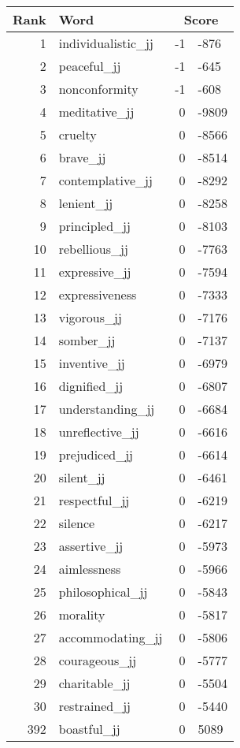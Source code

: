 \begin{longtable}[!htbp]{| rlr@{.}l |}
    \hline
    \textbf{Rank} & \textbf{Word} & \multicolumn{2}{c|}{\textbf{Score}} \\
    \hline
    \endhead
    1 & individualistic\_jj & -1 & -876 \\
    2 & peaceful\_jj & -1 & -645 \\
    3 & nonconformity & -1 & -608 \\
    4 & meditative\_jj & 0 & -9809 \\
    5 & cruelty & 0 & -8566 \\
    6 & brave\_jj & 0 & -8514 \\
    7 & contemplative\_jj & 0 & -8292 \\
    8 & lenient\_jj & 0 & -8258 \\
    9 & principled\_jj & 0 & -8103 \\
    10 & rebellious\_jj & 0 & -7763 \\
    11 & expressive\_jj & 0 & -7594 \\
    12 & expressiveness & 0 & -7333 \\
    13 & vigorous\_jj & 0 & -7176 \\
    14 & somber\_jj & 0 & -7137 \\
    15 & inventive\_jj & 0 & -6979 \\
    16 & dignified\_jj & 0 & -6807 \\
    17 & understanding\_jj & 0 & -6684 \\
    18 & unreflective\_jj & 0 & -6616 \\
    19 & prejudiced\_jj & 0 & -6614 \\
    20 & silent\_jj & 0 & -6461 \\
    21 & respectful\_jj & 0 & -6219 \\
    22 & silence & 0 & -6217 \\
    23 & assertive\_jj & 0 & -5973 \\
    24 & aimlessness & 0 & -5966 \\
    25 & philosophical\_jj & 0 & -5843 \\
    26 & morality & 0 & -5817 \\
    27 & accommodating\_jj & 0 & -5806 \\
    28 & courageous\_jj & 0 & -5777 \\
    29 & charitable\_jj & 0 & -5504 \\
    30 & restrained\_jj & 0 & -5440 \\
    392 & boastful\_jj & 0 & 5089 \\

\end{longtable}
